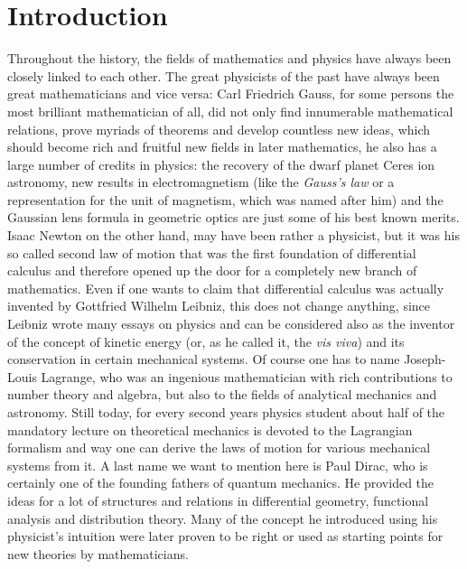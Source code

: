 
%
%

\chapter{Introduction}
\label{sec:Intro}

Throughout the history, the fields of mathematics and physics have always been 
closely linked to each other. The great physicists of the past have always been 
great mathematicians and vice versa: Carl Friedrich Gauss, for some persons the 
most brilliant mathematician of all, did not only find innumerable mathematical 
relations, prove myriads of theorems and develop countless new ideas, which 
should become rich and fruitful new fields in later mathematics, he also has a 
large number of credits in physics: the recovery of the dwarf planet Ceres ion 
astronomy, new results in electromagnetism (like the \emph{Gauss's law} or a 
representation for the unit of magnetism, which was named after him) and the 
Gaussian lens formula in geometric optics are just some of his best known 
merits. Isaac Newton on the other hand, may have been rather a physicist, but 
it was his so called second law of motion that was the first foundation of 
differential calculus and therefore opened up the door for a completely new 
branch of mathematics. Even if one wants to claim that differential calculus 
was actually invented by Gottfried Wilhelm Leibniz, this does not change 
anything, since Leibniz wrote many essays on physics and can be considered also 
as the inventor of the concept of kinetic energy (or, as he called it, the 
\emph{vis viva}) and its conservation in certain mechanical systems. Of course 
one has to name Joseph-Louis Lagrange, who was an ingenious mathematician with 
rich contributions to number theory and algebra, but also to the fields of 
analytical mechanics and astronomy. Still today, for every second years physics 
student about half of the mandatory lecture on theoretical mechanics is devoted 
to the Lagrangian formalism and way one can derive the laws of motion for 
various mechanical systems from it. A last name we want to mention here is Paul 
Dirac, who is certainly one of the founding fathers of quantum mechanics. He 
provided the ideas for a lot of structures and relations in differential 
geometry, functional analysis and distribution theory. Many of the concept he 
introduced using his physicist's intuition were later proven to be right or 
used as starting points for new theories by mathematicians.


